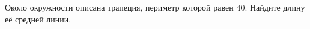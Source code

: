 \begin{ex}
	\begin{condition}
		 Около окружности описана трапеция, периметр которой равен \( 40 \). Найдите длину её средней линии.
	\end{condition}
\end{ex}